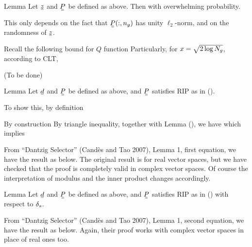 \Result
{Lemma}
{
Let \(\V{z}\) and \(\M{P}\) be defined as above.
Then
%
%
with overwhelming probability.
}

This only depends on the fact that \(\M{P}(:, n_g)\) has unity \(\ell_2\)-norm, and on the randomness of \(\V{z}\).

Recall the following bound for \(Q\) function
Particularly, for \(x =\sqrt{2 \log N_g}\), according to CLT,

{ \color{red} (To be done) }

\Result
{Lemma}
{
Let \(\V{d}\) and \(\M{P}\) be defined as above, and \(\M{P}\) satisfies RIP as in ().
%
}

To show this, by definition
%

By construction
By triangle inequality, together with Lemma (), we have
which implies

From ``Dantzig Selector'' (Cand\`es and Tao 2007), Lemma 1, first equation, we have the result as below.
The original result is for real vector spaces, but we have checked that the proof is completely valid in complex vector spaces.
Of course the interpretation of modulus and the inner product changes accordingly.

\Result
{Lemma}
{
Let \(\V{d}\) and \(\M{P}\) be defined as above, and \(\M{P}\) satisfies RIP as in () with respect to \(\delta_s\).
%
%
}

From ``Dantzig Selector'' (Cand\`es and Tao 2007), Lemma 1, second equation, we have the result as below.
Again, their proof works with complex vector spaces in place of real ones too.


